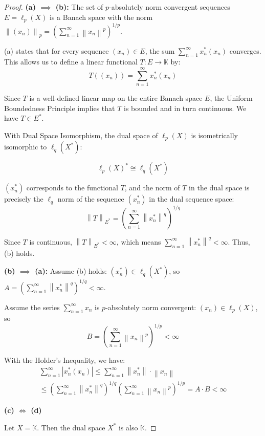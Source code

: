 \documentclass{article}
\newcommand{\norm}[1]{\left\|#1\right\|}
\newcommand{\abs}[1]{\left|#1\right|}
\begin{document}
\begin{proof}

\textbf{(a) $\implies$ (b):}
The set of $p$-absolutely norm convergent sequences $E = \ell_p(X)$ is a Banach space with the norm $\norm{(x_n)}_p = \left(\sum_{n=1}^{\infty} \norm{x_n}^p\right)^{1/p}$.

(a) states that for every sequence $(x_n) \in E$, the sum $\sum_{n=1}^{\infty}x_{n}^{*}(x_{n})$ converges. This allows us to define a linear functional $T: E \to \mathbb{K}$ by:
$$
T((x_n)) = \sum_{n=1}^{\infty} x_{n}^{*}(x_{n})
$$

Since $T$ is a well-defined linear map on the entire Banach space $E$, the Uniform Boundedness Principle implies that $T$ is bounded and in turn continuous. We have $T \in E^*$.

With Dual Space Isomorphism, the dual space of $\ell_p(X)$ is isometrically isomorphic to $\ell_q(X^*)$:

$$\ell_p(X)^* \cong \ell_q(X^*)$$

$(x_n^*)$ corresponds to the functional $T$, and the norm of $T$ in the dual space is precisely the $\ell_q$ norm of the sequence $(x_n^*)$ in the dual sequence space:
$$
\norm{T}_{E^*} = \left(\sum_{n=1}^{\infty} \norm{x_{n}^{*}}^{q}\right)^{1/q}
$$

Since $T$ is continuous, $\norm{T}_{E^*} < \infty$, which means $\sum_{n=1}^{\infty}\norm{x_{n}^{*}}^{q}<\infty$. Thus, (b) holds.


\textbf{(b) $\implies$ (a):}
Assume (b) holds: $(x_n^*) \in \ell_q(X^*)$, so $A = \left(\sum_{n=1}^{\infty} \norm{x_{n}^{*}}^{q}\right)^{1/q} < \infty$.

Assume the series $\sum_{n=1}^{\infty} x_n$ is $p$-absolutely norm convergent: 
$(x_n) \in \ell_p(X)$, so 
$$
B = \left(\sum_{n=1}^{\infty} \norm{x_{n}}^{p}\right)^{1/p} < \infty
$$

With the Holder's Inequality, we have:
\begin{gather}
    \sum_{n=1}^{\infty} \abs{x_{n}^{*}(x_{n})} \leq 
    \sum_{n=1}^{\infty} \norm{x_{n}^{*}} \cdot \norm{x_{n}} 
    \\
    \leq \left(\sum_{n=1}^{\infty} \norm{x_{n}^{*}}^{q}\right)^{1/q} \left(\sum_{n=1}^{\infty} \norm{x_{n}}^{p}\right)^{1/p} = A \cdot B < \infty
\end{gather}


\vspace{0.5em}
\textbf{(c) $\iff$ (d)}

Let $X=\mathbb{K}$. Then the dual space $X^*$ is also $\mathbb{K}$.


\end{proof}
\end{document}
